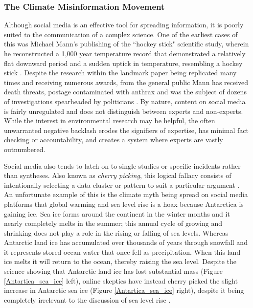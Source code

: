 \documentclass{article}
\begin{document}
\subsubsection{The Climate Misinformation Movement}
Although social media is an effective tool for spreading information, it is poorly suited to the communication of a complex science. One of the earliest cases of this was Michael Mann’s publishing of the ``hockey stick" scientific study, wherein he reconstructed a 1,000 year temperature record that demonstrated a relatively flat downward period and a sudden uptick in temperature, resembling a hockey stick \cite{mann1999northern}. Despite the research within the landmark paper being replicated many times and receiving numerous awards, from the general public Mann has received death threats, postage contaminated with anthrax and was the subject of dozens of investigations spearheaded by politicians \cite{washingtonpost2016mann}. By nature, content on social media is fairly unregulated and does not distinguish between experts and non-experts. While the interest in environmental research may be helpful, the often unwarranted negative backlash erodes the signifiers of expertise, has minimal fact checking or accountability, and creates a system where experts are vastly outnumbered.

Social media also tends to latch on to single studies or specific incidents rather than syntheses. Also known as \textit{cherry picking}, this logical fallacy consists of intentionally selecting a data cluster or pattern to suit a particular argument \cite{logicalfallacies2021}. An unfortunate example of this is the climate myth being spread on social media platforms that global warming and sea level rise is a hoax because Antarctica is gaining ice. Sea ice forms around the continent in the winter months and it nearly completely melts in the summer; this annual cycle of growing and shrinking does not play a role in the rising or falling of sea levels. Whereas Antarctic land ice has accumulated over thousands of years through snowfall and it represents stored ocean water that once fell as precipitation. When this land ice melts it will return to the ocean, thereby raising the sea level. Despite the science showing that Antarctic land ice has lost substantial mass (Figure \ref{Antartica_sea_ice} left), online skeptics have instead cherry picked the slight increase in Antarctic sea ice (Figure \ref{Antartica_sea_ice} right), despite it being completely irrelevant to the discussion of sea level rise \cite{skepticalscientist2021antarticaice}. 
\end{document}
